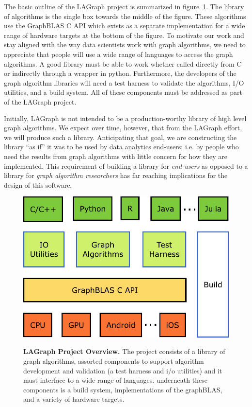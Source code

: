 The basic outline of the LAGraph project  is summarized in 
figure~\ref{fig:overview}. The library of algorithms is the single box towards
the middle of the figure.  These algorithms use the GraphBLAS C API
which exists as a separate implementation for a wide range of hardware
targets at the bottom of the figure.  To motivate our work and stay aligned 
with the way data scientists work with graph algorithms, we need to appreciate that
people will use a wide range of languages to access the graph algorithms.  A good library
must be able to work whether called directly from C or indirectly through a wrapper in python.
Furthermore, the developers of the graph algorithm libraries will need a test harness to
validate the algorithms, I/O utilities, and a build system.  All of these components must
be addressed as part of the LAGraph project. 

Initially, LAGraph is not intended to be a production-worthy library of 
high level graph algorithms.  We expect over time, however, that from the LAGraph 
effort, we will produce such a library.  Anticipating that goal, we are constructing
the library ``as if'' it was to be used by data analytics end-users; i.e. by people
who need the results from graph algorithms with little concern for how they are
implemented.  This requirement of building a library for \emph{end-users} as opposed to 
a library for \emph{graph algorithm researchers} has far reaching implications for the 
design of this software.

\begin{figure}[t]
	\includegraphics[width=\linewidth]{fig/lagraph}
	\label{fig:overview}
	\caption
	{\textbf{LAGraph Project Overview.} The project consists of a library of 
	graph algorithms, assorted components to support algorithm development and validation
	(a test harness and i/o utilities) and it must interface to a wide range of languages.
	underneath these components is a build system, implementations of the graphBLAS, 
	and a variety of hardware targets. }
\end{figure}

